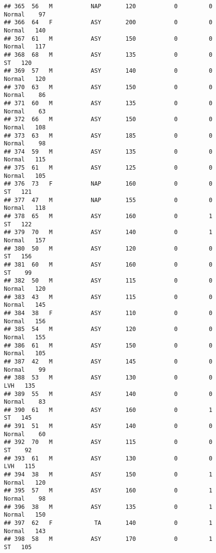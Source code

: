 \documentclass[
]{article}
\begin{document}
\begin{verbatim}
## 365  56   M           NAP       120           0         0     Normal    97
## 366  64   F           ASY       200           0         0     Normal   140
## 367  61   M           ASY       150           0         0     Normal   117
## 368  68   M           ASY       135           0         0         ST   120
## 369  57   M           ASY       140           0         0     Normal   120
## 370  63   M           ASY       150           0         0     Normal    86
## 371  60   M           ASY       135           0         0     Normal    63
## 372  66   M           ASY       150           0         0     Normal   108
## 373  63   M           ASY       185           0         0     Normal    98
## 374  59   M           ASY       135           0         0     Normal   115
## 375  61   M           ASY       125           0         0     Normal   105
## 376  73   F           NAP       160           0         0         ST   121
## 377  47   M           NAP       155           0         0     Normal   118
## 378  65   M           ASY       160           0         1         ST   122
## 379  70   M           ASY       140           0         1     Normal   157
## 380  50   M           ASY       120           0         0         ST   156
## 381  60   M           ASY       160           0         0         ST    99
## 382  50   M           ASY       115           0         0     Normal   120
## 383  43   M           ASY       115           0         0     Normal   145
## 384  38   F           ASY       110           0         0     Normal   156
## 385  54   M           ASY       120           0         0     Normal   155
## 386  61   M           ASY       150           0         0     Normal   105
## 387  42   M           ASY       145           0         0     Normal    99
## 388  53   M           ASY       130           0         0        LVH   135
## 389  55   M           ASY       140           0         0     Normal    83
## 390  61   M           ASY       160           0         1         ST   145
## 391  51   M           ASY       140           0         0     Normal    60
## 392  70   M           ASY       115           0         0         ST    92
## 393  61   M           ASY       130           0         0        LVH   115
## 394  38   M           ASY       150           0         1     Normal   120
## 395  57   M           ASY       160           0         1     Normal    98
## 396  38   M           ASY       135           0         1     Normal   150
## 397  62   F            TA       140           0         1     Normal   143
## 398  58   M           ASY       170           0         1         ST   105

\end{verbatim}
\end{document}
